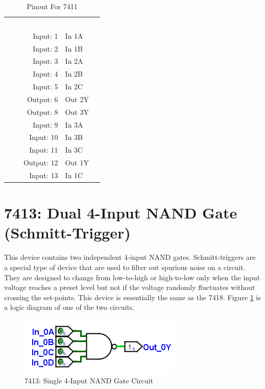 \begin{table}[H]
	\sffamily
	\newcommand{\head}[1]{\textcolor{white}{\textbf{#1}}}		
	\begin{center}
		\begin{tabular}{rl} 
			\rowcolor{black!75}
			\head{Logisim Label} & \head{Function} \\
			Input: 1   & In 1A  \\
			Input: 2   & In 1B  \\
			Input: 3   & In 2A \\
			Input: 4   & In 2B  \\
			Input: 5   & In 2C  \\
			Output: 6  & Out 2Y \\
			Output: 8  & Out 3Y \\
			Input: 9   & In 3A  \\
			Input: 10  & In 3B  \\
			Input: 11  & In 3C \\
			Output: 12 & Out 1Y  \\
			Input: 13  & In 1C  \\
		\end{tabular}
	\end{center}
	\caption{Pinout For 7411}
	\label{tab:50-7411}
\end{table}

\section{7413: Dual 4-Input NAND Gate (Schmitt-Trigger)}

This device contains two independent 4-input NAND gates. Schmitt-triggers are a special type of device that are used to filter out spurious noise on a circuit. They are designed to change from low-to-high or high-to-low only when the input voltage reaches a preset level but not if the voltage randomly fluctuates without crossing the set-points. This device is essentially the same as the 7418. Figure \ref{fig:app_ttl-7413} is a logic diagram of one of the two circuits.

\begin{figure}[H]
	\centering
	\includegraphics{gfx/app_ttl-7413}
	\caption{7413: Single 4-Input NAND Gate Circuit}
	\label{fig:app_ttl-7413}
\end{figure}

